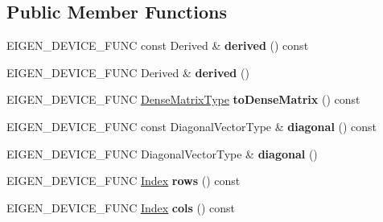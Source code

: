 \subsection*{Public Member Functions}
\begin{DoxyCompactItemize}
\item 
\mbox{\label{class_eigen_1_1_diagonal_base_a3c99bfd342f96df1e795cfa82672686e}} 
E\+I\+G\+E\+N\+\_\+\+D\+E\+V\+I\+C\+E\+\_\+\+F\+U\+NC const Derived \& {\bfseries derived} () const
\item 
\mbox{\label{class_eigen_1_1_diagonal_base_a7469600c500a349e1b728ba86eb9b267}} 
E\+I\+G\+E\+N\+\_\+\+D\+E\+V\+I\+C\+E\+\_\+\+F\+U\+NC Derived \& {\bfseries derived} ()
\item 
\mbox{\label{class_eigen_1_1_diagonal_base_a578b87659abce86f82c21e012577f64a}} 
E\+I\+G\+E\+N\+\_\+\+D\+E\+V\+I\+C\+E\+\_\+\+F\+U\+NC \mbox{\hyperlink{class_eigen_1_1_matrix}{Dense\+Matrix\+Type}} {\bfseries to\+Dense\+Matrix} () const
\item 
\mbox{\label{class_eigen_1_1_diagonal_base_a98d954efacff5c32f7acbb1f51050673}} 
E\+I\+G\+E\+N\+\_\+\+D\+E\+V\+I\+C\+E\+\_\+\+F\+U\+NC const Diagonal\+Vector\+Type \& {\bfseries diagonal} () const
\item 
\mbox{\label{class_eigen_1_1_diagonal_base_a094f1467bf3ebbbe0db30520275940f6}} 
E\+I\+G\+E\+N\+\_\+\+D\+E\+V\+I\+C\+E\+\_\+\+F\+U\+NC Diagonal\+Vector\+Type \& {\bfseries diagonal} ()
\item 
\mbox{\label{class_eigen_1_1_diagonal_base_a29c20477a3fc4092919fd3b0b28574f3}} 
E\+I\+G\+E\+N\+\_\+\+D\+E\+V\+I\+C\+E\+\_\+\+F\+U\+NC \mbox{\hyperlink{struct_eigen_1_1_eigen_base_a554f30542cc2316add4b1ea0a492ff02}{Index}} {\bfseries rows} () const
\item 
\mbox{\label{class_eigen_1_1_diagonal_base_ab2f60c33e1a0024414d6bb129d34bb4b}} 
E\+I\+G\+E\+N\+\_\+\+D\+E\+V\+I\+C\+E\+\_\+\+F\+U\+NC \mbox{\hyperlink{struct_eigen_1_1_eigen_base_a554f30542cc2316add4b1ea0a492ff02}{Index}} {\bfseries cols} () const
\item 

\end{DoxyCompactItemize}

